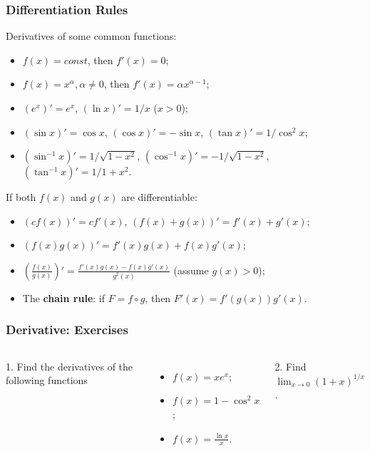 \documentclass{beamer}
\begin{document}
\begin{frame}
\frametitle{Differentiation Rules}
Derivatives of some common functions:
\begin{itemize}
\item $f(x)=const$, then $f'(x)=0$;
\item $f(x) = x^{\alpha}, \alpha \neq 0$, then $f'(x) = \alpha x^{\alpha-1}$;
\item $(e^{x})'= e^{x}$, $(\ln x)' = 1/x$ ($x > 0$);
\item $(\sin x)' = \cos x$, $(\cos x)' = -\sin x$, $(\tan x)' = 1/\cos ^2 x$;
\item $(\sin^{-1} x)' = 1/\sqrt{1-x^2}$, $(\cos^{-1} x)' = -1/\sqrt{1-x^2}$, $(\tan^{-1} x)' = 1/{1+x^2}$.
\end{itemize}
If both $f(x)$ and $g(x)$ are differentiable:
\begin{itemize}
\item $(cf(x))' = cf'(x)$, $(f(x)+g(x))' = f'(x)+g'(x)$;
\item $(f(x)g(x))' = f'(x)g(x) + f(x)g'(x)$;
\item  $\left(\frac{f(x)}{g(x)} \right)'=\frac{f'(x)g(x) - f(x)g'(x)}{g^2(x)}$ (assume $g(x) > 0$);
\item The \textbf{chain rule}: if $F = f \circ g$, then $F'(x) = f'(g(x))g'(x)$.
\end{itemize}
\end{frame}

\begin{frame}
\frametitle{Derivative: Exercises}
\begin{columns}[t] %

1. Find the derivatives of the following functions
\begin{itemize}
\item $f(x) = x e^x$;
\item $f(x) = 1 - \cos^2 x$;
\item $f(x) = \frac{\ln x}{x}$.
\end{itemize}

2. Find $\lim_{x \rightarrow 0} (1+x)^{1/x}$.

\end{columns}
\end{frame}
\end{document}
